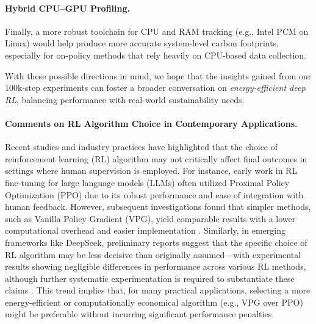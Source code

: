 \paragraph{Hybrid CPU–GPU Profiling.}
Finally, a more robust toolchain for CPU and RAM tracking (e.g., Intel PCM on Linux) 
would help produce more accurate system-level carbon footprints, 
especially for on-policy methods that rely heavily on CPU-based data collection.

\medskip
With these possible directions in mind, we hope that the insights gained from 
our 100k-step experiments can foster a broader conversation on 
\emph{energy-efficient deep RL}, balancing performance with real-world sustainability needs.


\paragraph{Comments on RL Algorithm Choice in Contemporary Applications.}
Recent studies and industry practices have highlighted that the choice of reinforcement learning (RL) algorithm may not critically affect final outcomes in settings where human supervision is employed. For instance, early work in RL fine-tuning for large language models (LLMs) often utilized Proximal Policy Optimization (PPO) due to its robust performance and ease of integration with human feedback. However, subsequent investigations found that simpler methods, such as Vanilla Policy Gradient (VPG), yield comparable results with a lower computational overhead and easier implementation \cite{raffel:exploring_rl_for_llms, ouyang:ppo_vpg_comparison}. Similarly, in emerging frameworks like DeepSeek, preliminary reports suggest that the specific choice of RL algorithm may be less decisive than originally assumed---with experimental results showing negligible differences in performance across various RL methods, although further systematic experimentation is required to substantiate these claims \cite{deepseek:blog, zhang:rl_in_deepseek}. This trend implies that, for many practical applications, selecting a more energy-efficient or computationally economical algorithm (e.g., VPG over PPO) might be preferable without incurring significant performance penalties.
